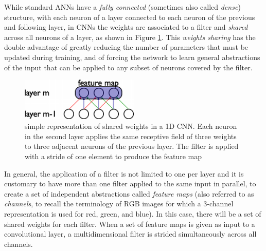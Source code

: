While standard ANNs have a \textit{fully connected} (sometimes also called 
\textit{dense}) structure, with each neuron of a layer connected to each neuron 
of the previous and following layer, in CNNs the weights are associated to a 
filter and \textit{shared} across all neurons of a layer, as shown in Figure
\ref{f:shared_weights}. 
This \textit{weights sharing} has the double advantage of greatly reducing the 
number of parameters that must be updated during training, and of forcing the 
network to learn general abstractions of the input that can be applied to any 
subset of neurons covered by the filter.
%
\begin{figure}[h]
\includegraphics[width=0.5\textwidth]{pictures/shared_weights}
\centering
\caption[Shared weights in CNN]{simple representation of shared weights in a 1D 
	CNN. Each neuron in  the second layer applies the same receptive field 
	of three weights to three adjacent neurons of the previous layer. The 
	filter is applied with a stride of one element to produce the feature 
	map}
\label{f:shared_weights}
\end{figure}
%

In general, the application of a filter is not limited to one per layer and it 
is customary to have more than one filter applied to the same input in parallel,
to create a set of independent abstractions called \textit{feature maps} (also
referred to as \textit{channels}, to recall the terminology of RGB images for 
which a 3-channel representation is used for red, green, and blue). In 
this case, there will be a set of shared weights for each filter.
When a set of feature maps is given as input to a convolutional layer, a 
multidimensional filter is strided simultaneously across all channels.

